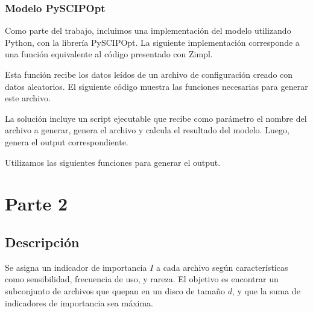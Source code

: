 \documentclass[11pt, a4paper, pdftex]{article}
\begin{document}


\newpage
\subsubsection{Modelo PySCIPOpt}

Como parte del trabajo, incluimos una implementación del modelo utilizando
Python, con la librería PySCIPOpt. La siguiente implementación corresponde 
a una función equivalente al código presentado con Zimpl.



\newpage

Esta función recibe los datos leídos de un archivo de configuración creado 
con datos aleatorios. El siguiente código muestra las funciones necesarias para generar este archivo.




La solución incluye un script ejecutable que recibe como parámetro el nombre del 
archivo a generar, genera el archivo y calcula el resultado del modelo. Luego, 
genera el output correspondiente.



\newpage

Utilizamos las siguientes funciones para generar el output.



\section{Parte 2}

\subsection{Descripción}

Se asigna un indicador de importancia $I$ a cada archivo según
características como sensibilidad, frecuencia de uso, y rareza. El
objetivo es encontrar un subconjunto de archivos que quepan en un disco
de tamaño $d$, y que la suma de indicadores de importancia sea máxima.
\end{document}
